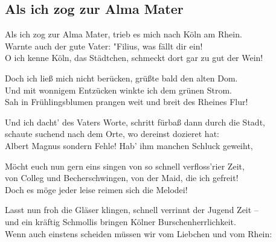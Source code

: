 
\subsection*{Als ich zog zur Alma Mater}
%
%
\nopagebreak
\hfill%
\nopagebreak
\thestrophe Als ich zog zur Alma Mater, trieb es mich nach Köln am Rhein. \\
Warnte auch der gute Vater: "Filius, was fällt dir ein! \\
O ich kenne Köln, das Städtchen, schmeckt dort gar zu gut der Wein! \\

\thestrophe Doch ich ließ mich nicht berücken, grüßte bald den alten Dom. \\
Und mit wonnigem Entzücken winkte ich dem grünen Strom. \\
Sah in Frühlingsblumen prangen weit und breit des Rheines Flur! \\

\thestrophe Und ich dacht' des Vaters Worte, schritt fürbaß dann durch die Stadt, \\
schaute suchend nach dem Orte, wo dereinst dozieret hat: \\
Albert Magnus sondern Fehle! Hab' ihm manchen Schluck geweiht, \\

\thestrophe Möcht euch nun gern eins singen von so schnell verfloss'rier Zeit, \\
von Colleg und Becherschwingen, von der Maid, die ich gefreit! \\
Doch es möge jeder leise reimen sich die Melodei! \\

\thestrophe Lasst nun froh die Gläser klingen, schnell verrinnt der Jugend Zeit – \\
und ein kräftig Schmollis bringen Kölner Burschenherrlichkeit.\\
Wenn auch einstens scheiden müssen wir vom Liebchen und vom Rhein: \\
